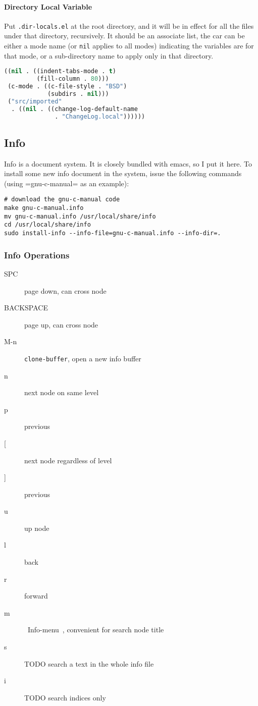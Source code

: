 \paragraph{Directory Local Variable}
Put \texttt{.dir-locals.el} at the root directory, and it will be in
effect for all the files under that directory, recursively.  It should
be an associate list, the car can be either a mode name (or \texttt{nil}
applies to all modes) indicating the variables are for that mode, or a
sub-directory name to apply only in that directory.
\begin{lstlisting}[language=lisp]
((nil . ((indent-tabs-mode . t)
         (fill-column . 80)))
 (c-mode . ((c-file-style . "BSD")
            (subdirs . nil)))
 ("src/imported"
  . ((nil . ((change-log-default-name
              . "ChangeLog.local"))))))
\end{lstlisting}


\subsection{Info}
Info is a document system.  It is closely bundled with emacs, so I put
it here.  To install some new info document in the system, issue the
following commands (using =gnu-c-manual= as an example):

\begin{lstlisting}
# download the gnu-c-manual code
make gnu-c-manual.info
mv gnu-c-manual.info /usr/local/share/info
cd /usr/local/share/info
sudo install-info --info-file=gnu-c-manual.info --info-dir=.
\end{lstlisting}

\subsubsection{Info Operations}

\begin{description}
\item [SPC] page down, can cross node
\item [BACKSPACE] page up, can cross node
\item [M-n] \texttt{clone-buffer}, open a new info buffer
\item [n] next node on same level
\item [p] previous
\item [{[}] next node regardless of level
\item [{]}] previous
\item [u] up node
\item [l] back
\item [r] forward
\item [m] ~Info-menu~, convenient for search node title
\item [s] TODO search  a text in the whole info file
\item [i] TODO search indices only
\end{description}


